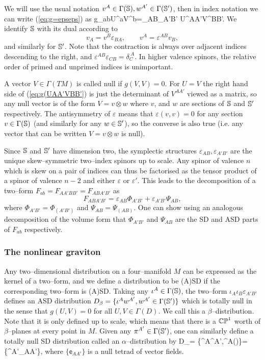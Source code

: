 We will use the usual notation $v^A\in\Gamma(\mathbb{S}),w^{A'}\in\Gamma(\mathbb{S}')$, then in index notation we can write (\ref{eq:g=epseps}) as
\be \label{eq:g(UAA'VBB'}
g_{ab}U^aV^b=\varepsilon_{AB}\varepsilon_{A'B'} U^{AA'}V^{BB'}.
\ee
We identify $\mathbb{S}$ with its dual according to
\[
v_A=v^B\varepsilon_{BA},\qquad v^A=\varepsilon^{AB}v_B,
\]
and similarly for $\mathbb{S}'$. Note that the contraction is always over adjacent indices descending to the right, and $\varepsilon^{AB}\varepsilon_{CB}=\delta_C^{\ A}$. In higher valence spinors, the relative order of primed and unprimed indices is unimportant.

A vector $V\in \Gamma(TM)$ is called null if $g(V, V)=0$. For $U=V$ the right hand side of (\ref{eq:g(UAA'VBB'}) is just the determinant of $V^{AA'} $ viewed as a matrix, so any null vector is of the form
$V=v \otimes w$ where $v$, and $w$ are sections of
$\mathbb{S}$ and $\mathbb{S}'$ respectively. The antisymmetry of $\varepsilon$ means that $\varepsilon(v,v)=0$ for any section $v\in\Gamma(\mathbb{S})$ (and similarly for any $w\in\mathbb{S}'$), so the converse is also true (i.e. any vector that can be written $V=v\otimes w$ is null).

Since $\mathbb{S}$ and $\mathbb{S}'$ have dimension two, the symplectic structures $\varepsilon_{AB},\varepsilon_{A'B'}$ are the unique skew--symmetric two--index spinors up to scale. Any spinor of valence $n$ which is skew on a pair of indices can thus be factorised as the tensor product of a spinor of valence $n-2$ and either $\varepsilon$ or $\varepsilon'$. This leads to the decomposition of a two--form $F_{ab}=F_{AA'BB'}=F_{ABA'B'}$ as
\[
F_{ABA'B'} = \varepsilon_{AB}\Phi_{A'B'} + \varepsilon_{A'B'}\Psi_{AB},
\]
where $\Phi_{A'B'}=\Phi_{(A'B')}$ and $\Psi_{AB}=\Psi_{(AB)}$. One can show using an analogous decomposition of the volume form that $\Phi_{A'B'}$ and $\Psi_{AB}$ are the SD and ASD parts of $F_{ab}$ respectively.

\subsubsection{The nonlinear graviton}
Any two--dimensional distribution on a four--manifold $M$ can be expressed as the kernel of a two--form, and we define a distribution to be (A)SD if the corresponding two--form is (A)SD. Taking any $\iota^A\in\Gamma(\mathbb{S})$, the two--form $\iota_A\iota_B\varepsilon_{A'B'}$ defines an ASD distribution $D_\beta=\{\iota^Aw^{A'},w^{A'}\in\Gamma(\mathbb{S}')\}$ which is totally null in the sense that $g(U,V)=0$ for all $U,V\in\Gamma(D)$. We call this a $\beta$--distribution. Note that it is only defined up to scale, which means that there is a $\mathbb{CP}^1$ worth of $\beta$--planes at every point in $M$. Given any $\pi^{A'}\in\Gamma(\mathbb{S}')$, one can similarly define a totally null SD distribution called an $\alpha$--distribution by
\be \label{eq:alpha_dist}
D_\alpha = \{\iota^A\pi^{A'},\iota^{A}\in\Gamma(\spp)\}=\{\pi^{A'}_{AA'}\},
\ee
where $\{\mathsf{e}_{AA'}\}$ is a null tetrad of vector fields.

